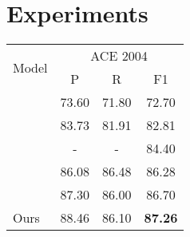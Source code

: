 \documentclass{article}
\begin{document}
\section{Experiments}

\begin{table}
\centering
\begin{tabular}{lccc}
\toprule
\multirow{2}{*}{Model}   & \multicolumn{3}{c}{ACE 2004}  \\
 \cmidrule(lr){2-4} 
& P  & R & F1  \\
\midrule



\citep{katiyar2018nested} 
&  73.60 &  71.80 &  72.70 \\
\citep{shibuya2019nested}   & 83.73 & 81.91 & 82.81\\
\citep{strakova2019neural}  & - & - &  84.40  \\
\citep{jue2020pyramid}       & 86.08  & 86.48  & 86.28     \\
\citep{yu2020named}       & 87.30  & 86.00  & 86.70     \\
\midrule
Ours    & 88.46  & 86.10  & \textbf{87.26}  \\


\end{tabular}
\end{table}
\end{document}
